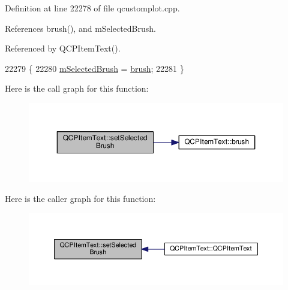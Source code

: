 Definition at line 22278 of file qcustomplot.\+cpp.



References brush(), and m\+Selected\+Brush.



Referenced by Q\+C\+P\+Item\+Text().


\begin{DoxyCode}
22279 \{
22280   \hyperlink{class_q_c_p_item_text_a28ccd097b42a216d81db9c6869f54a59}{mSelectedBrush} = \hyperlink{class_q_c_p_item_text_a38b981dfacb703efa8e27346eebcb5a2}{brush};
22281 \}
\end{DoxyCode}


Here is the call graph for this function\+:\nopagebreak
\begin{figure}[H]
\begin{center}
\leavevmode
\includegraphics[width=350pt]{class_q_c_p_item_text_a6b8377eeb2af75eb9528422671ac16cb_cgraph}
\end{center}
\end{figure}




Here is the caller graph for this function\+:\nopagebreak
\begin{figure}[H]
\begin{center}
\leavevmode
\includegraphics[width=350pt]{class_q_c_p_item_text_a6b8377eeb2af75eb9528422671ac16cb_icgraph}
\end{center}
\end{figure}


\hypertarget{class_q_c_p_item_text_ae7ba0bdb75c897b028388e45bfd435fa}{}
